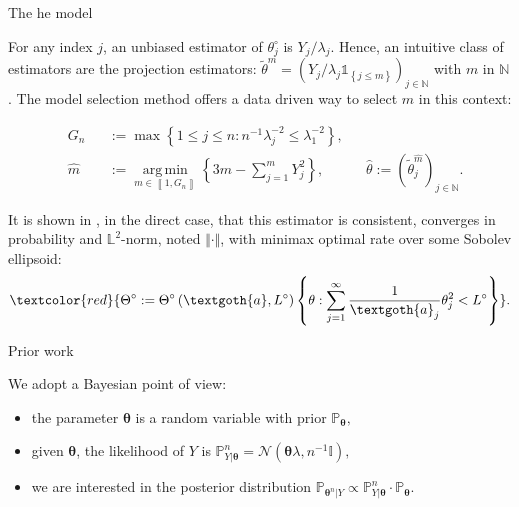 \documentclass[final,hyperref={pdfpagelabels=false}]{beamer}
\DeclareMathOperator*{\argmin}{arg\,min}
\begin{document}
\begin{frame}[t]
\begin{columns}[t]
\begin{column}{.30\textwidth}
\begin{block}{\rule{0pt}{2.5ex} The he model}
For any index $j$, an unbiased estimator of $\theta^{\circ}_{j}$ is $Y_{j}/\lambda_{j}$.
Hence, an intuitive class of estimators are the projection estimators: $\tilde{\theta}^{m} = \left(Y_{j}/\lambda_{j} \mathds{1}_{\left\{j \leq m\right\}}\right)_{j \in \mathbb{N}}$ with $m$ in $\mathbb{N}$.
The model selection method offers a data driven way to select $m$ in this context:

\textcolor{red!90!black}{
\begin{alignat*}{3}
&G_{n} && := \max\left\{1 \leq j \leq n : n^{-1} \lambda_{j}^{-2} \leq \lambda_{1}^{-2}\right\}, &&\\
&\widehat{m} && := \argmin\limits_{m \in \left\llbracket 1 , G_{n} \right\rrbracket}\left\{3 m -\sum\limits_{j = 1}^{m} Y_{j}^{2}\right\}, &&\widehat{\theta} := \left( \tilde{\theta}^{\widehat{m}}_{j} \right)_{j \in \mathbb{N}}.
\end{alignat*}}

\bigskip

It is shown in \citet{PM}, in the direct case, that this estimator is \textcolor{red!90!black}{consistent}, converges in probability and $\mathbb{L}^{2}$-norm, noted $\Vert \cdot \Vert$, with \textcolor{red!90!black}{minimax optimal rate} over some Sobolev ellipsoid:
\[\textcolor{red}{\Theta^{\circ} := \Theta^{\circ}\left(\textgoth{a}, L^{\circ}\right) \left\{\theta : \sum\limits_{j = 1}^{\infty} \frac{1}{\textgoth{a}_{j}}\theta_{j}^{2} < L^{\circ}\right\}}.\]
\end{block}

\begin{block}{\rule{0pt}{2.5ex} Prior work}
We adopt a \textcolor{red!90!black}{Bayesian point of view}:
\begin{itemize}
\item the parameter $\boldsymbol{\theta}$ is a random variable with prior $\mathbb{P}_{\boldsymbol{\theta}},$
\item given $\boldsymbol{\theta}$, the likelihood of $Y$ is $\mathbb{P}_{Y \vert \boldsymbol{\theta}}^{n} = \mathcal{N}\left(\boldsymbol{\theta} \lambda, n^{-1} \mathbb{I}\right),$
\item we are interested in the posterior distribution $\mathbb{P}_{\boldsymbol{\theta}^{n} \vert Y} \propto \mathbb{P}_{Y \vert \boldsymbol{\theta}}^{n} \cdot \mathbb{P}_{\boldsymbol{\theta}}.$
\end{itemize}


\end{block}
\end{column}
\end{columns}
\end{frame}
\end{document}
